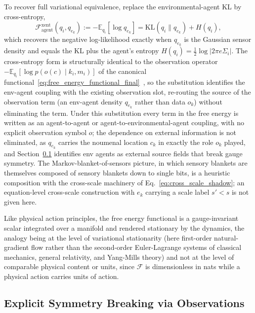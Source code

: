 \documentclass[11pt]{article}
\begin{document}
To recover full variational equivalence, replace the environmental-agent KL by cross-entropy,
\begin{equation}
\mathcal{F}_{\text{agent}}^{\mathrm{xent}}(q_i, q_{e_k}) := -\mathbb{E}_{q_i}[\log q_{e_k}] = \mathrm{KL}(q_i \| q_{e_k}) + H(q_i),
\label{eq:xent_resolution}
\end{equation}
which recovers the negative log-likelihood exactly when $q_{e_k}$ is the Gaussian sensor density and equals the KL plus the agent's entropy $H(q_i) = \tfrac{1}{2}\log|2\pi e \Sigma_i|$. The cross-entropy form is structurally identical to the observation operator $-\mathbb{E}_{q_i}[\log p(o(c)\mid k_i, m_i)]$ of the canonical functional~\eqref{eq:free_energy_functional_final}~\cite{Friston2010, parr2022active}, so the substitution identifies the env-agent coupling with the existing observation slot, re-routing the source of the observation term (an env-agent density $q_{e_k}$ rather than data $o_k$) without eliminating the term. Under this substitution every term in the free energy is written as an agent-to-agent or agent-to-environmental-agent coupling, with no explicit observation symbol $o$; the dependence on external information is not eliminated, as $q_{e_k}$ carries the noumenal location $c_k$ in exactly the role $o_k$ played, and Section~\ref{sec:symmetry_breaking} identifies env agents as external source fields that break gauge symmetry. The Markov-blanket-of-sensors picture, in which sensory blankets are themselves composed of sensory blankets down to single bits, is a heuristic composition with the cross-scale machinery of Eq.~\eqref{eq:cross_scale_shadow}; an equation-level cross-scale construction with $e_k$ carrying a scale label $s' < s$ is not given here.

Like physical action principles, the free energy functional is a gauge-invariant scalar integrated over a manifold and rendered stationary by the dynamics, the analogy being at the level of variational stationarity (here first-order natural-gradient flow rather than the second-order Euler-Lagrange systems of classical mechanics, general relativity, and Yang-Mills theory) and not at the level of comparable physical content or units, since $\mathcal{F}$ is dimensionless in nats while a physical action carries units of action.

\subsection{Explicit Symmetry Breaking via Observations}
\label{sec:symmetry_breaking}
\end{document}
